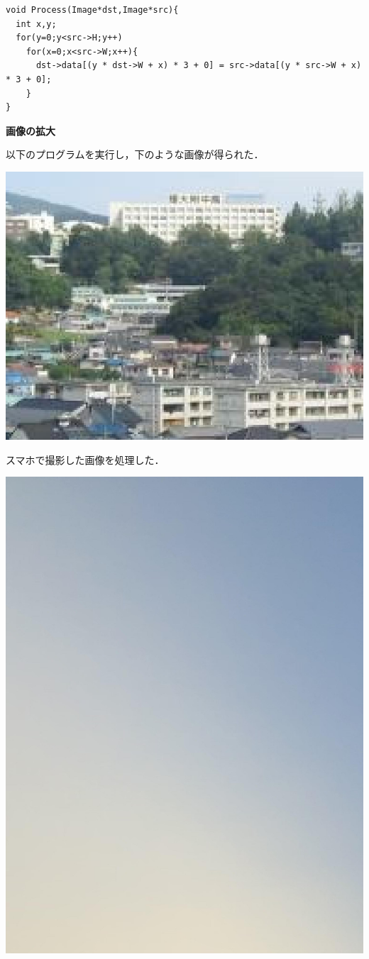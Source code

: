 \documentclass[11pt]{jarticle}
\begin{document}
\begin{lstlisting}
void Process(Image*dst,Image*src){
  int x,y;
  for(y=0;y<src->H;y++)
    for(x=0;x<src->W;x++){
      dst->data[(y * dst->W + x) * 3 + 0] = src->data[(y * src->W + x) * 3 + 0];
    }
}
\end{lstlisting}

{\bf 画像の拡大}

以下のプログラムを実行し，下のような画像が得られた．

\includegraphics[scale=.5]{./img/kakudai.jpg}

スマホで撮影した画像を処理した．

\includegraphics[scale=.1]{./img/tsuyama_kakudai.jpg}
\end{document}
